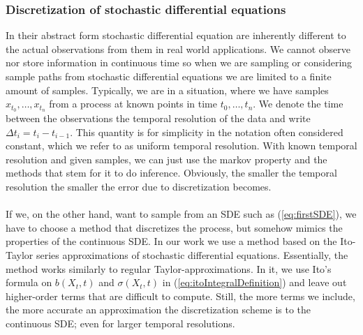 \subsubsection{Discretization of stochastic differential equations}\label{subsubsec:Discretization}
In their abstract form stochastic differential equation are inherently different to the actual observations from them in real world applications.
We cannot observe nor store information in continuous time so when we are sampling or considering sample paths from stochastic differential equations we are limited to a finite amount of samples. Typically, we are in a situation, where we have samples $x_{t_0},\dots, x_{t_n}$ from a process at known points in time $t_0,\dots,t_n$. We denote the time between the observations the temporal resolution of the data and write $\Delta t_i = t_{i} - t_{i - 1}$. This quantity is for simplicity in the notation often considered constant, which we refer to as uniform temporal resolution. With known temporal resolution and given samples, we can just use the markov property and the methods that stem for it to do inference. Obviously, the smaller the temporal resolution the smaller the error due to discretization becomes.\\\\
If we, on the other hand, want to sample from an SDE such as (\ref{eq:firstSDE}), we have to choose a method that discretizes the process, but somehow mimics the properties of the continuous SDE. In our work we use a method based on the Ito-Taylor series approximations of stochastic differential equations. Essentially, the method works similarly to regular Taylor-approximations. In it, we use Ito's formula on $b(X_t, t)$ and $\sigma(X_t, t)$ in (\ref{eq:itoIntegralDefinition}) and leave out higher-order terms that are difficult to compute. Still, the more terms we include, the more accurate an approximation the discretization scheme is to the continuous SDE; even for larger temporal resolutions.

